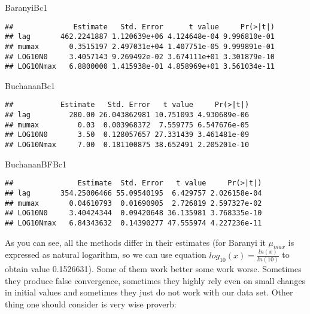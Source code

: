 \documentclass[]{book}
\newenvironment{Shaded}{\begin{snugshade}}{\end{snugshade}}
\newcommand{\NormalTok}[1]{#1}
\theoremstyle{definition}
\theoremstyle{definition}
\theoremstyle{definition}
\theoremstyle{remark}
\begin{document}
\begin{Shaded}
\begin{Highlighting}[]
\NormalTok{BaranyiBc1}
\end{Highlighting}
\end{Shaded}

\begin{verbatim}
##              Estimate   Std. Error      t value     Pr(>|t|)
## lag       462.2241887 1.120639e+06 4.124648e-04 9.996810e-01
## mumax       0.3515197 2.497031e+04 1.407751e-05 9.999891e-01
## LOG10N0     3.4057143 9.269492e-02 3.674111e+01 3.301879e-10
## LOG10Nmax   6.8800000 1.415938e-01 4.858969e+01 3.561034e-11
\end{verbatim}

\begin{Shaded}
\begin{Highlighting}[]
\NormalTok{BuchananBc1}
\end{Highlighting}
\end{Shaded}

\begin{verbatim}
##           Estimate   Std. Error   t value     Pr(>|t|)
## lag         280.00 26.043862981 10.751093 4.930689e-06
## mumax         0.03  0.003968372  7.559775 6.547676e-05
## LOG10N0       3.50  0.128057657 27.331439 3.461481e-09
## LOG10Nmax     7.00  0.181100875 38.652491 2.205201e-10
\end{verbatim}

\begin{Shaded}
\begin{Highlighting}[]
\NormalTok{BuchananBFBc1}
\end{Highlighting}
\end{Shaded}

\begin{verbatim}
##               Estimate  Std. Error   t value     Pr(>|t|)
## lag       354.25006466 55.09540195  6.429757 2.026158e-04
## mumax       0.04610793  0.01690905  2.726819 2.597327e-02
## LOG10N0     3.40424344  0.09420648 36.135981 3.768335e-10
## LOG10Nmax   6.84343632  0.14390277 47.555974 4.227236e-11
\end{verbatim}

As you can see, all the methods differ in their estimates (for Baranyi
it \(\mu_{max}\) is expressed as natural logarithm, so we can use
equation \(log_{10}(x) = \frac{ln(x)}{ln(10)}\) to obtain value
0.1526631). Some of them work better some work worse. Sometimes they
produce false convergence, sometimes they highly rely even on small
changes in initial values and sometimes they just do not work with our
data set. Other thing one should consider is very wise proverb:
\end{document}

